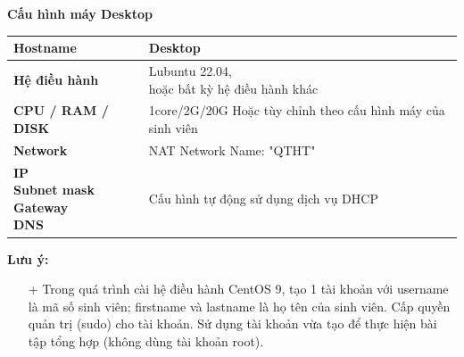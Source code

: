 \begin{itemize}
\begin{minipage}{\linewidth}
\begin{multicols}{2}
        \begin{minipage}{\linewidth}
          \captionsetup{type=table}
          \caption{\bfseries Cấu hình máy Desktop}
          \centering
          \begin{tabular}{| m{.46\linewidth} | m{.42\linewidth} |}
            \hline
            \textbf{Hostname}                                                                                 & Desktop                                                                                 \\\hline
            \parbox[c][2.5cm][c]{\linewidth}{\textbf{Hệ điều hành}}                                           & \parbox[c][2.5cm][c]{\linewidth}{Lubuntu 22.04, \newline hoặc bất kỳ hệ điều hành khác} \\\hline
            \textbf{CPU / RAM / DISK}                                                                         & 1core/2G/20G \newline Hoặc tùy chỉnh theo cấu hình máy của sinh viên                    \\\hline
            \textbf{Network}                                                                                  & NAT Network \newline Name: "QTHT"                                                       \\\hline
            \parbox[c][2.69cm][c]{\linewidth}{\textbf{IP \newline Subnet mask \newline Gateway \newline DNS}} & \parbox[c][2.69cm][c]{\linewidth}{Cấu hình tự động sử dụng dịch vụ DHCP}                \\\hline
          \end{tabular}
        \end{minipage}
      \end{multicols}
    \end{minipage}

    \vspace{.3cm}
    \textbf{Lưu ý:}
    \begin{itemize}
      \item[+] Trong quá trình cài hệ điều hành CentOS 9, tạo 1 tài khoản với username là mã số sinh viên; firstname và lastname là họ tên của sinh viên. Cấp quyền quản trị (sudo) cho tài khoản. Sử dụng tài khoản vừa tạo để thực hiện bài tập tổng hợp (không dùng tài khoản root).
    \end{itemize}
\end{itemize}

